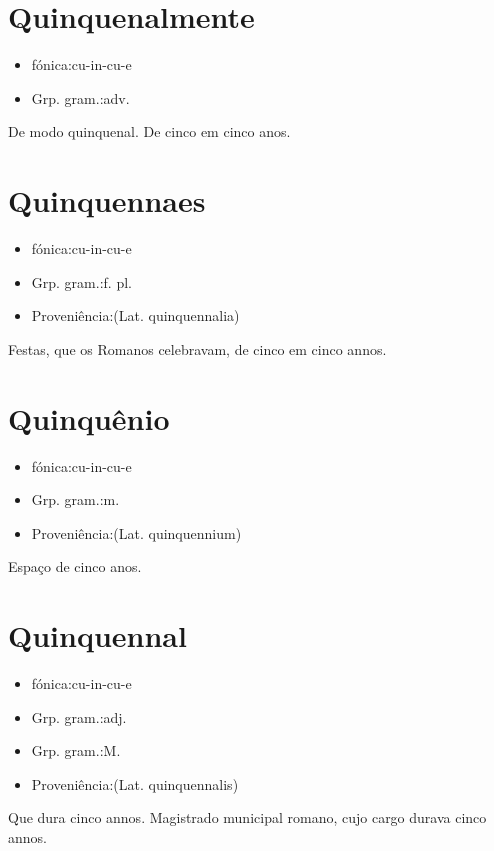 \section{Quinquenalmente}
\begin{itemize}
\item {fónica:cu-in-cu-e}
\end{itemize}
\begin{itemize}
\item {Grp. gram.:adv.}
\end{itemize}
De modo quinquenal.
De cinco em cinco anos.
\section{Quinquennaes}
\begin{itemize}
\item {fónica:cu-in-cu-e}
\end{itemize}
\begin{itemize}
\item {Grp. gram.:f. pl.}
\end{itemize}
\begin{itemize}
\item {Proveniência:(Lat. \textunderscore quinquennalia\textunderscore )}
\end{itemize}
Festas, que os Romanos celebravam, de cinco em cinco annos.
\section{Quinquênio}
\begin{itemize}
\item {fónica:cu-in-cu-e}
\end{itemize}
\begin{itemize}
\item {Grp. gram.:m.}
\end{itemize}
\begin{itemize}
\item {Proveniência:(Lat. \textunderscore quinquennium\textunderscore )}
\end{itemize}
Espaço de cinco anos.
\section{Quinquennal}
\begin{itemize}
\item {fónica:cu-in-cu-e}
\end{itemize}
\begin{itemize}
\item {Grp. gram.:adj.}
\end{itemize}
\begin{itemize}
\item {Grp. gram.:M.}
\end{itemize}
\begin{itemize}
\item {Proveniência:(Lat. \textunderscore quinquennalis\textunderscore )}
\end{itemize}
Que dura cinco annos.
Magistrado municipal romano, cujo cargo durava cinco annos.
